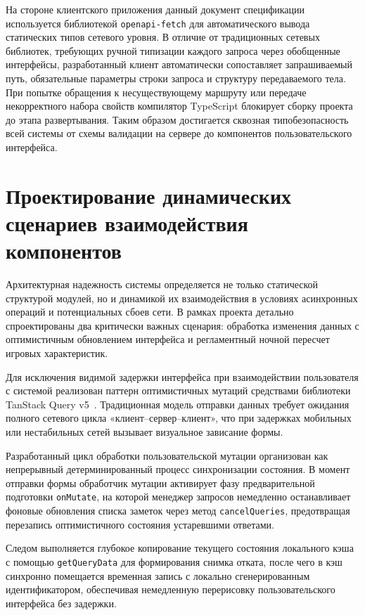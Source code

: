 \documentclass[a4paper,14pt]{extreport}
\begin{document}
На стороне клиентского приложения данный документ спецификации используется библиотекой \texttt{openapi-fetch} для автоматического вывода статических типов сетевого уровня. В отличие от традиционных сетевых библиотек, требующих ручной типизации каждого запроса через обобщенные интерфейсы, разработанный клиент автоматически сопоставляет запрашиваемый путь, обязательные параметры строки запроса и структуру передаваемого тела. При попытке обращения к несуществующему маршруту или передаче некорректного набора свойств компилятор TypeScript блокирует сборку проекта до этапа развертывания. Таким образом достигается сквозная типобезопасность всей системы от схемы валидации на сервере до компонентов пользовательского интерфейса.

\section{Проектирование динамических сценариев взаимодействия компонентов}

Архитектурная надежность системы определяется не только статической структурой модулей, но и динамикой их взаимодействия в условиях асинхронных операций и потенциальных сбоев сети. В рамках проекта детально спроектированы два критически важных сценария: обработка изменения данных с оптимистичным обновлением интерфейса и регламентный ночной пересчет игровых характеристик.

Для исключения видимой задержки интерфейса при взаимодействии пользователя с системой реализован паттерн оптимистичных мутаций средствами библиотеки TanStack Query v5~\cite{ref21}. Традиционная модель отправки данных требует ожидания полного сетевого цикла «клиент--сервер--клиент», что при задержках мобильных или нестабильных сетей вызывает визуальное зависание формы.

Разработанный цикл обработки пользовательской мутации организован как непрерывный детерминированный процесс синхронизации состояния. В момент отправки формы обработчик мутации активирует фазу предварительной подготовки \texttt{onMutate}, на которой менеджер запросов немедленно останавливает фоновые обновления списка заметок через метод \texttt{cancelQueries}, предотвращая перезапись оптимистичного состояния устаревшими ответами.

Следом выполняется глубокое копирование текущего состояния локального кэша с помощью \texttt{getQueryData} для формирования снимка отката, после чего в кэш синхронно помещается временная запись с локально сгенерированным идентификатором, обеспечивая немедленную перерисовку пользовательского интерфейса без задержки.
\end{document}
